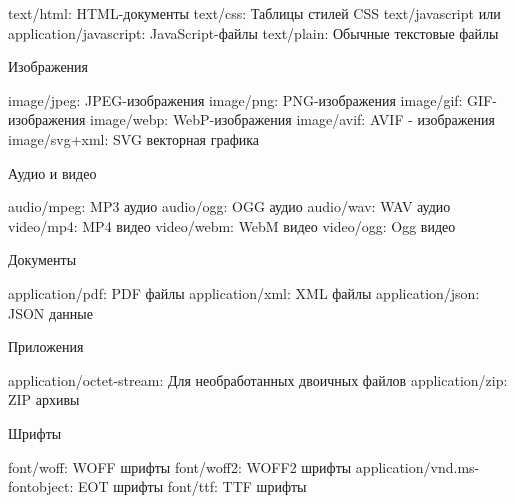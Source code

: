 \documentclass[12pt]{article}
\begin{document}
text/html: HTML-документы
text/css: Таблицы стилей CSS
text/javascript или application/javascript: JavaScript-файлы
text/plain: Обычные текстовые файлы

Изображения

image/jpeg: JPEG-изображения
image/png: PNG-изображения
image/gif: GIF-изображения
image/webp: WebP-изображения
image/avif: AVIF - изображения
image/svg+xml: SVG векторная графика

Аудио и видео

audio/mpeg: MP3 аудио
audio/ogg: OGG аудио
audio/wav: WAV аудио
video/mp4: MP4 видео
video/webm: WebM видео
video/ogg: Ogg видео

Документы

application/pdf: PDF файлы
application/xml: XML файлы
application/json: JSON данные

Приложения

application/octet-stream: Для необработанных двоичных файлов
application/zip: ZIP архивы

Шрифты

font/woff: WOFF шрифты
font/woff2: WOFF2 шрифты
application/vnd.ms-fontobject: EOT шрифты
font/ttf: TTF шрифты
\end{document}
